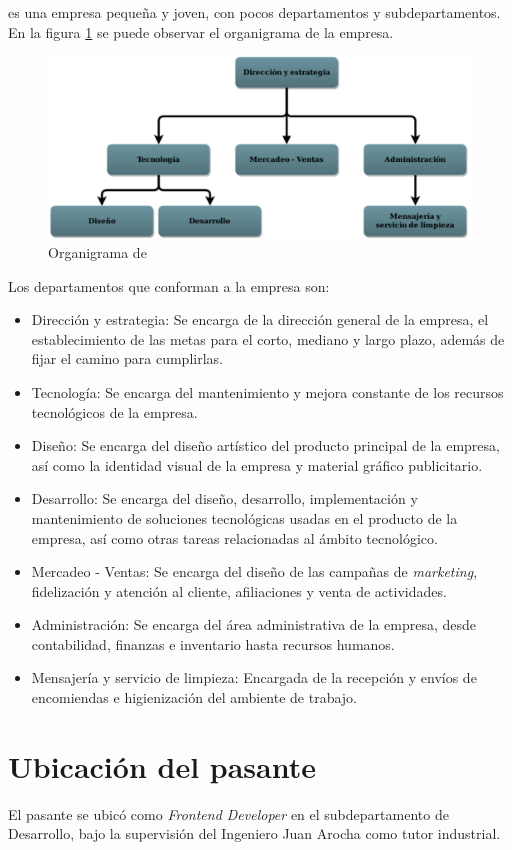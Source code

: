 \business es una empresa pequeña y joven, con pocos departamentos y subdepartamentos. En la figura \ref{fig:organization} se puede observar el organigrama de la empresa.

\begin{figure}
  \includegraphics[width=\linewidth]{figures/organization.png}
  \caption{Organigrama de \business}
  \label{fig:organization}
\end{figure}

Los departamentos que conforman a la empresa son:

\begin{itemize}
  \item Dirección y estrategia: Se encarga de la dirección general de la empresa, el establecimiento de las metas para el corto, mediano y largo plazo, además de fijar el camino para cumplirlas.
  \item Tecnología: Se encarga del mantenimiento y mejora constante de los recursos tecnológicos de la empresa.
  \item Diseño: Se encarga del diseño artístico del producto principal de la empresa, así como la identidad visual de la empresa y material gráfico publicitario.
  \item Desarrollo: Se encarga del diseño, desarrollo, implementación y mantenimiento de soluciones tecnológicas usadas en el producto de la empresa, así como otras tareas relacionadas al ámbito tecnológico.
  \item Mercadeo - Ventas: Se encarga del diseño de las campañas de \textit{marketing}, fidelización y atención al cliente, afiliaciones y venta de actividades.
  \item Administración: Se encarga del área administrativa de la empresa, desde contabilidad, finanzas e inventario hasta recursos humanos.
  \item Mensajería y servicio de limpieza: Encargada de la recepción y envíos de encomiendas e higienización del ambiente de trabajo.
\end{itemize}

\section{Ubicación del pasante}

El pasante se ubicó como \textit{Frontend Developer} en el subdepartamento de Desarrollo, bajo la supervisión del Ingeniero Juan Arocha como tutor industrial.

